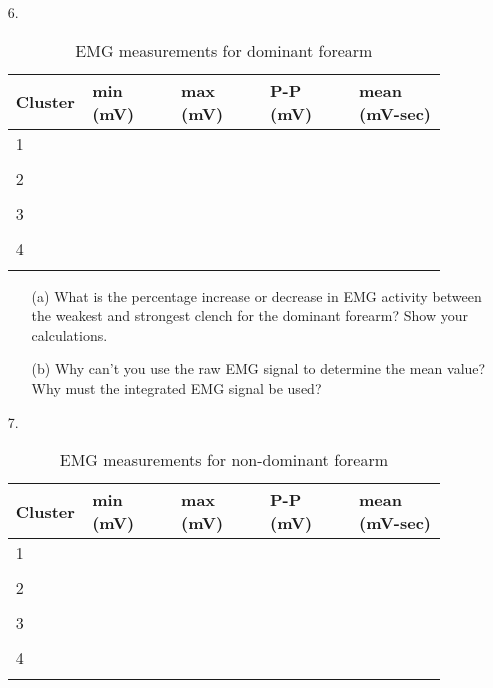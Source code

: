\documentclass{article}
\begin{document}
\begin{itemize}
	\item[6.]
	
	\begin{table}[h!]
	\centering
	\caption{EMG measurements for dominant forearm}
	\begin{tabular}[h!]{p{0.1\linewidth}|p{0.2\linewidth}p{0.2\linewidth}p{0.2\linewidth}p{0.2\linewidth}}
	\toprule
	Cluster & min (mV) & max (mV) & P-P (mV) & mean (mV-sec)\\
	\midrule
	1 & & & &\\& & & &\\
	
	\midrule
	2 & & & &\\& & & &\\
	\midrule
	3 & & & &\\& & & &\\
	\midrule
	4 & & & &\\& & & &\\
	\bottomrule
	\end{tabular}
	\end{table}
	
	\begin{itemize}
		\item[(a)] What is the percentage increase or decrease in EMG activity between the weakest and strongest clench for the dominant forearm? Show your calculations.\vspace{4cm}
		\item[(b)] Why can't you use the raw EMG signal to determine the mean value? Why must the integrated EMG signal be used?\vspace{3cm}
	\end{itemize}
	
	\item[7.]
	\begin{table}[h!]
	\centering
	\caption{EMG measurements for non-dominant forearm}
	\begin{tabular}[h!]{p{0.1\linewidth}|p{0.2\linewidth}p{0.2\linewidth}p{0.2\linewidth}p{0.2\linewidth}}
	\toprule
	Cluster & min (mV) & max (mV) & P-P (mV) & mean (mV-sec)\\
	\midrule
	1 & & & &\\& & & &\\
	
	\midrule
	2 & & & &\\& & & &\\
	\midrule
	3 & & & &\\& & & &\\
	\midrule
	4 & & & &\\& & & &\\
	\bottomrule
	\end{tabular}
	\end{table}
	

\end{itemize}
\end{document}
